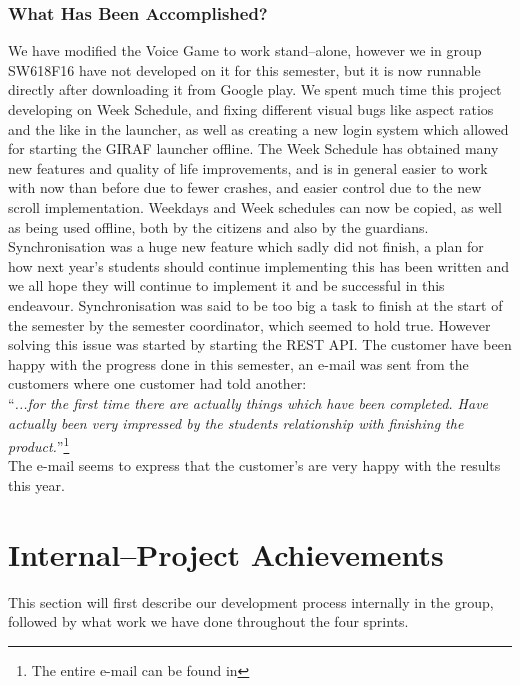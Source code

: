 \subsubsection*{What Has Been Accomplished?}
We have modified the Voice Game to work stand--alone, however we in group SW618F16 have not developed on it for this semester, but it is now runnable directly after downloading it from Google play.
We spent much time this project developing on Week Schedule, and fixing different visual bugs like aspect ratios and the like in the launcher, as well as creating a new login system which allowed for starting the GIRAF launcher offline.
The Week Schedule has obtained many new features and quality of life improvements, and is in general easier to work with now than before due to fewer crashes, and easier control due to the new scroll implementation.
Weekdays and Week schedules can now be copied, as well as being used offline, both by the citizens and also by the guardians.
Synchronisation was a huge new feature which sadly did not finish, a plan for how next year's students should continue implementing this has been written and we all hope they will continue to implement it and be successful in this endeavour.
Synchronisation was said to be too big a task to finish at the start of the semester by the semester coordinator, which seemed to hold true.
However solving this issue was started by starting the REST API.
The customer have been happy with the progress done in this semester, an e-mail was sent from the customers where one customer had told another:\\
\enquote{\textit{...for the first time there are actually things which have been completed. Have actually been very impressed by the students relationship with finishing the product.}}\footnote{The entire e-mail can be found in }
\\
The e-mail seems to express that the customer's are very happy with the results this year.

\section{Internal--Project Achievements}
This section will first describe our development process internally in the group, followed by what work we have done throughout the four sprints.


